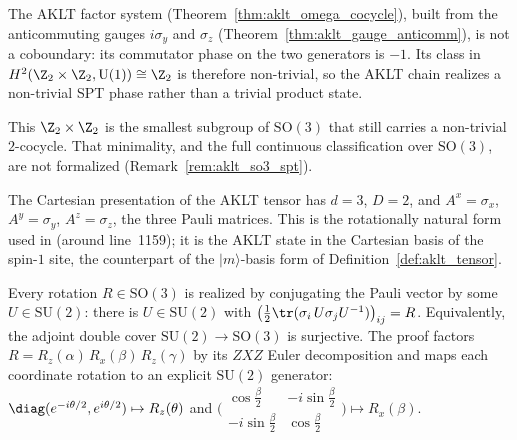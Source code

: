 \begin{theorem}\label{thm:aklt_nontrivial_spt}
    \leanok
    The AKLT factor system (Theorem~\ref{thm:aklt_omega_cocycle}), built from the
    anticommuting gauges $i\sigma_y$ and $\sigma_z$
    (Theorem~\ref{thm:aklt_gauge_anticomm}), is not a coboundary: its commutator
    phase on the two generators is $-1$.  Its class in
    $H^2(\Z_2 \times \Z_2, \mathrm{U}(1)) \cong \Z_2$ is therefore non-trivial,
    so the AKLT chain realizes a non-trivial SPT phase rather than a trivial
    product state.
\end{theorem}

\begin{remark}\label{rem:aklt_z2z2_spt}
    This $\Z_2 \times \Z_2$ is the smallest subgroup of $\mathrm{SO}(3)$ that
    still carries a non-trivial $2$-cocycle.  That minimality, and the full
    continuous classification over $\mathrm{SO}(3)$, are not formalized
    (Remark~\ref{rem:aklt_so3_spt}).
\end{remark}

\begin{definition}\label{def:aklt_cartesian}
    \leanok
    The Cartesian presentation of the AKLT tensor has $d = 3$, $D = 2$, and
    $A^x = \sigma_x$, $A^y = \sigma_y$, $A^z = \sigma_z$, the three Pauli
    matrices.  This is the rotationally natural form used in
    \cite{Cirac2021Matrix} (around line~1159); it is the AKLT state in the
    Cartesian basis of the spin-$1$ site, the counterpart of the
    $|m\rangle$-basis form of Definition~\ref{def:aklt_tensor}.
\end{definition}

\begin{theorem}\label{thm:su2_so3_surjective}
    \leanok
    Every rotation $R \in \mathrm{SO}(3)$ is realized by conjugating the Pauli
    vector by some $U \in \mathrm{SU}(2)$: there is $U \in \mathrm{SU}(2)$ with
    $\bigl(\tfrac12 \tr(\sigma_i\, U \sigma_j U^{-1})\bigr)_{ij} = R$.
    Equivalently, the adjoint double cover $\mathrm{SU}(2)\to\mathrm{SO}(3)$ is
    surjective.  The proof factors $R = R_z(\alpha)\,R_x(\beta)\,R_z(\gamma)$ by
    its $ZXZ$ Euler decomposition and maps each coordinate rotation to an explicit
    $\mathrm{SU}(2)$ generator:
    $\diag(e^{-i\theta/2}, e^{i\theta/2}) \mapsto R_z(\theta)$ and
    $\bigl(\begin{smallmatrix}\cos\frac\beta2 & -i\sin\frac\beta2 \\
    -i\sin\frac\beta2 & \cos\frac\beta2\end{smallmatrix}\bigr) \mapsto R_x(\beta)$.
\end{theorem}

